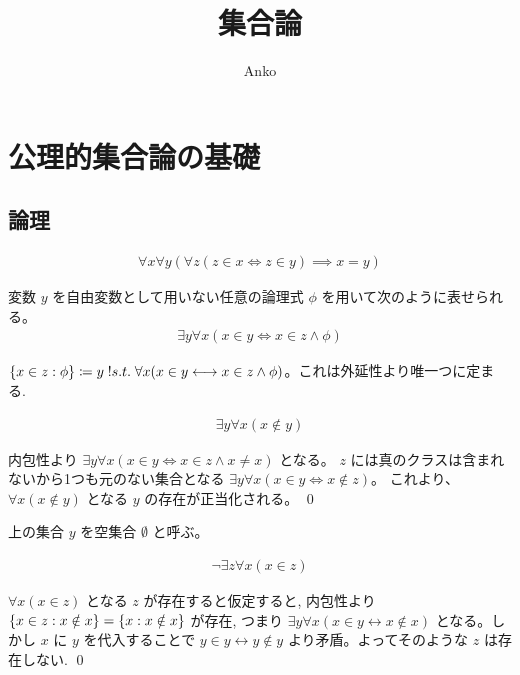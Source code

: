 \documentclass[uplatex,dvipdfmx,a4paper,11pt]{jlreq}
\title{集合論}
\author{Anko}
\makeatletter
\theoremstyle{definition}
\renewenvironment{proof}[1][\proofname]{\par
  \normalfont
  \topsep6\p@\@plus6\p@ \trivlist
  \item[\hskip\labelsep{\bfseries #1}\@addpunct{\bfseries}]\ignorespaces\quad\par
}{%
  \qed\endtrivlist\@endpefalse
}
\renewcommand\proofname{証明}
\makeatother
\begin{document}
\maketitle

\section{公理的集合論の基礎}
\subsection{論理}
\begin{axiom}[外延性]
  \begin{align}
    \forall x\forall y(\forall z(z\in x\iff z\in y)\implies x=y)
  \end{align}
\end{axiom}
\begin{axiom}[内包性図式]
  変数 $y$ を自由変数として用いない任意の論理式 $\phi$ を用いて次のように表せられる。
  \begin{align}
    \exists y\forall x(x\in y\iff x\in z\land \phi)
  \end{align}
\end{axiom}

\begin{definition}[内包性図式]
  $\qty{x\in z:\phi}\coloneq y \thickspace\text!{s.t.}\thickspace \forall x(x\in y\longleftrightarrow x\in z\land \phi)$。これは外延性より唯一つに定まる.
\end{definition}

\begin{theorem}
  \begin{align}
    \exists y\forall x(x\notin y)
  \end{align}
\end{theorem}
\begin{proof}
  内包性より $\exists y\forall x(x\in y\iff x\in z\land x\neq x)$ となる。
  $z$ には真のクラスは含まれないから1つも元のない集合となる $\exists y\forall x(x\in y\iff x\notin z)$。
  これより、$\forall x(x\notin y)$ となる $y$ の存在が正当化される。
\end{proof}

\begin{definition}
  上の集合 $y$ を空集合 $\emptyset$ と呼ぶ。
\end{definition}

\begin{theorem}
  \begin{align}
    \lnot\exists z\forall x(x\in z)
  \end{align}
\end{theorem}
\begin{proof}
  $\forall x(x\in z)$ となる $z$ が存在すると仮定すると, 内包性より $\qty{x\in z: x\notin x} = \qty{x: x\notin x}$ が存在, つまり $\exists y\forall x(x\in y\longleftrightarrow x\notin x)$ となる。しかし $x$ に $y$ を代入することで $y\in y\longleftrightarrow y\notin y$ より矛盾。よってそのような $z$ は存在しない.
\end{proof}
\end{document}
